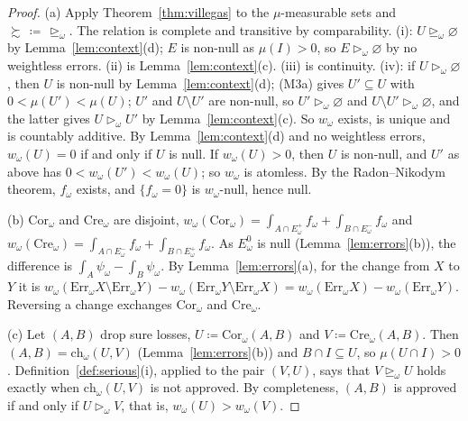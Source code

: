 \documentclass[11pt]{article}
\theoremstyle{definition}
\newcommand{\Err}{\mathrm{Err}}
\newcommand{\Cor}{\mathrm{Cor}}
\newcommand{\Cre}{\mathrm{Cre}}
\newcommand{\ch}{\mathrm{ch}}
\newcommand{\Ep}{E^{+}}
\newcommand{\Em}{E^{-}}
\newcommand{\Ez}{E^{0}}
\newcommand{\sge}{\trianglerighteq}
\newcommand{\sgt}{\triangleright}
\begin{document}
\begin{proof}
(a) Apply Theorem~\ref{thm:villegas} to the $\mu$-measurable sets and $\succsim\,\coloneqq\,\sge_\omega$. The relation is complete and transitive by comparability. (i): $U\sge_\omega\varnothing$ by Lemma~\ref{lem:context}(d); $E$ is non-null as $\mu(I)>0$, so $E\sgt_\omega\varnothing$ by no weightless errors. (ii) is Lemma~\ref{lem:context}(c). (iii) is continuity. (iv): if $U\sgt_\omega\varnothing$, then $U$ is non-null by Lemma~\ref{lem:context}(d); (M3a) gives $U'\subseteq U$ with $0<\mu(U')<\mu(U)$; $U'$ and $U\setminus U'$ are non-null, so $U'\sgt_\omega\varnothing$ and $U\setminus U'\sgt_\omega\varnothing$, and the latter gives $U\sgt_\omega U'$ by Lemma~\ref{lem:context}(c). So $w_\omega$ exists, is unique and is countably additive. By Lemma~\ref{lem:context}(d) and no weightless errors, $w_\omega(U)=0$ if and only if $U$ is null. If $w_\omega(U)>0$, then $U$ is non-null, and $U'$ as above has $0<w_\omega(U')<w_\omega(U)$; so $w_\omega$ is atomless. By the Radon--Nikodym theorem, $f_\omega$ exists, and $\{f_\omega=0\}$ is $w_\omega$-null, hence null.

(b) $\Cor_\omega$ and $\Cre_\omega$ are disjoint, $w_\omega(\Cor_\omega)=\int_{A\cap\Ep_\omega}f_\omega+\int_{B\cap\Em_\omega}f_\omega$ and $w_\omega(\Cre_\omega)=\int_{A\cap\Em_\omega}f_\omega+\int_{B\cap\Ep_\omega}f_\omega$. As $\Ez_\omega$ is null (Lemma~\ref{lem:errors}(b)), the difference is $\int_A\psi_\omega-\int_B\psi_\omega$. By Lemma~\ref{lem:errors}(a), for the change from $X$ to $Y$ it is $w_\omega(\Err_\omega X\setminus\Err_\omega Y)-w_\omega(\Err_\omega Y\setminus\Err_\omega X)=w_\omega(\Err_\omega X)-w_\omega(\Err_\omega Y)$. Reversing a change exchanges $\Cor_\omega$ and $\Cre_\omega$.

(c) Let $(A,B)$ drop sure losses, $U\coloneqq\Cor_\omega(A,B)$ and $V\coloneqq\Cre_\omega(A,B)$. Then $(A,B)=\ch_\omega(U,V)$ (Lemma~\ref{lem:errors}(b)) and $B\cap I\subseteq U$, so $\mu(U\cap I)>0$. Definition~\ref{def:serious}(i), applied to the pair $(V,U)$, says that $V\sge_\omega U$ holds exactly when $\ch_\omega(U,V)$ is not approved. By completeness, $(A,B)$ is approved if and only if $U\sgt_\omega V$, that is, $w_\omega(U)>w_\omega(V)$.
\end{proof}
\end{document}
